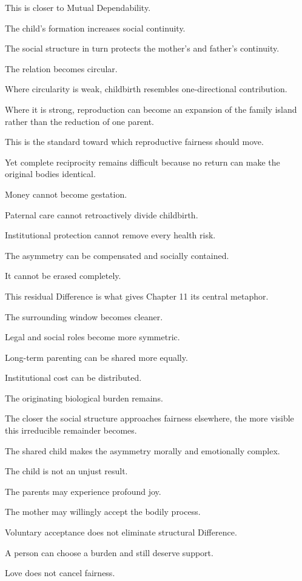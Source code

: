 This is closer to Mutual Dependability.

The child’s formation increases social continuity.

The social structure in turn protects the mother’s and father’s continuity.

The relation becomes circular.

Where circularity is weak, childbirth resembles one-directional contribution.

Where it is strong, reproduction can become an expansion of the family island rather than the reduction of one parent.

This is the standard toward which reproductive fairness should move.

Yet complete reciprocity remains difficult because no return can make the original bodies identical.

Money cannot become gestation.

Paternal care cannot retroactively divide childbirth.

Institutional protection cannot remove every health risk.

The asymmetry can be compensated and socially contained.

It cannot be erased completely.

This residual Difference is what gives Chapter 11 its central metaphor.

The surrounding window becomes cleaner.

Legal and social roles become more symmetric.

Long-term parenting can be shared more equally.

Institutional cost can be distributed.

The originating biological burden remains.

The closer the social structure approaches fairness elsewhere, the more visible this irreducible remainder becomes.

The shared child makes the asymmetry morally and emotionally complex.

The child is not an unjust result.

The parents may experience profound joy.

The mother may willingly accept the bodily process.

Voluntary acceptance does not eliminate structural Difference.

A person can choose a burden and still deserve support.

Love does not cancel fairness.

